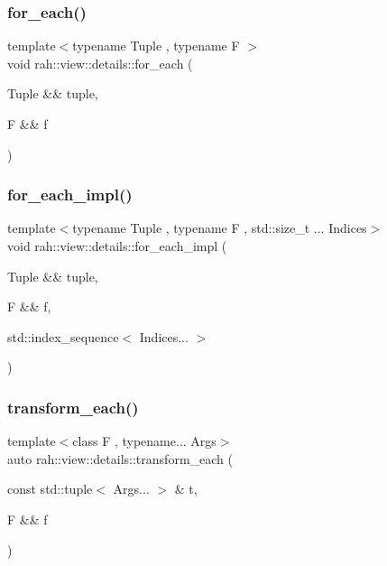 \subsubsection{\texorpdfstring{for\_each()}{for\_each()}}
{\footnotesize\ttfamily template$<$typename Tuple , typename F $>$ \\
void rah\+::view\+::details\+::for\+\_\+each (\begin{DoxyParamCaption}\item[{Tuple \&\&}]{tuple,  }\item[{F \&\&}]{f }\end{DoxyParamCaption})}

\mbox{\label{namespacerah_1_1view_1_1details_aaa1e7ec8fee6c6b2109932e61ff87312}} 
\subsubsection{\texorpdfstring{for\_each\_impl()}{for\_each\_impl()}}
{\footnotesize\ttfamily template$<$typename Tuple , typename F , std\+::size\+\_\+t ... Indices$>$ \\
void rah\+::view\+::details\+::for\+\_\+each\+\_\+impl (\begin{DoxyParamCaption}\item[{Tuple \&\&}]{tuple,  }\item[{F \&\&}]{f,  }\item[{std\+::index\+\_\+sequence$<$ Indices... $>$}]{ }\end{DoxyParamCaption})}

\mbox{\label{namespacerah_1_1view_1_1details_a805ec7d23709c75de8735c3735d05148}} 
\subsubsection{\texorpdfstring{transform\_each()}{transform\_each()}}
{\footnotesize\ttfamily template$<$class F , typename... Args$>$ \\
auto rah\+::view\+::details\+::transform\+\_\+each (\begin{DoxyParamCaption}\item[{const std\+::tuple$<$ Args... $>$ \&}]{t,  }\item[{F \&\&}]{f }\end{DoxyParamCaption})}

